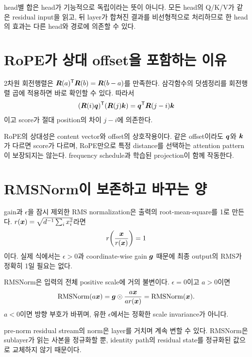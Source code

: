 head별 합은 head가 기능적으로 독립이라는 뜻이 아니다.
모든 head의 Q/K/V가 같은 residual input을 읽고, 뒤 layer가 합쳐진 결과를 비선형적으로 처리하므로 한 head의 효과는 다른 head와 경로에 의존할 수 있다.

\section{RoPE가 상대 offset을 포함하는 이유}

2차원 회전행렬은 $\bm{R}(a)^{\mathsf T}\bm{R}(b)=\bm{R}(b-a)$를 만족한다.
삼각함수의 덧셈정리를 회전행렬 곱에 적용하면 바로 확인할 수 있다.
따라서
\begin{equation}
  (\bm{R}(i)\bm{q})^{\mathsf T}(\bm{R}(j)\bm{k})
  =\bm{q}^{\mathsf T}\bm{R}(j-i)\bm{k}
\end{equation}
이고 score가 절대 position의 차이 $j-i$에 의존한다.

RoPE의 상대성은 content vector와 offset의 상호작용이다.
같은 offset이라도 $\bm{q}$와 $\bm{k}$가 다르면 score가 다르며, RoPE만으로 특정 distance를 선택하는 attention pattern이 보장되지는 않는다.
frequency schedule과 학습된 projection이 함께 작동한다.

\section{RMSNorm이 보존하고 바꾸는 양}

gain과 $\epsilon$을 잠시 제외한 RMS normalization은 출력의 root-mean-square를 1로 만든다.
$r(\bm{x})=\sqrt{d^{-1}\sum_i x_i^2}$라면
\begin{equation}
  r\!\left(\frac{\bm{x}}{r(\bm{x})}\right)=1
\end{equation}
이다.
실제 식에서는 $\epsilon>0$과 coordinate-wise gain $\bm{g}$ 때문에 최종 output의 RMS가 정확히 1일 필요는 없다.

RMSNorm은 입력의 전체 positive scale에 거의 불변이다.
$\epsilon=0$이고 $a>0$이면
\begin{equation}
  \operatorname{RMSNorm}(a\bm{x})
  =\bm{g}\odot\frac{a\bm{x}}{a r(\bm{x})}
  =\operatorname{RMSNorm}(\bm{x}).
\end{equation}
$a<0$이면 방향 부호가 바뀌며, 유한 $\epsilon$에서는 정확한 scale invariance가 아니다.

pre-norm residual stream의 norm은 layer를 거치며 계속 변할 수 있다.
RMSNorm은 sublayer가 읽는 사본을 정규화할 뿐, identity path의 residual state를 정규화된 값으로 교체하지 않기 때문이다.

